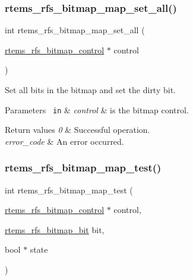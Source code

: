 \subsubsection{\texorpdfstring{rtems\_rfs\_bitmap\_map\_set\_all()}{rtems\_rfs\_bitmap\_map\_set\_all()}}
{\footnotesize\ttfamily int rtems\+\_\+rfs\+\_\+bitmap\+\_\+map\+\_\+set\+\_\+all (\begin{DoxyParamCaption}\item[{\mbox{\hyperlink{rtems-rfs-bitmaps_8h_aa1b1de5abc294444428eb1038d7f898b}{rtems\+\_\+rfs\+\_\+bitmap\+\_\+control}} $\ast$}]{control }\end{DoxyParamCaption})}

Set all bits in the bitmap and set the dirty bit.


\begin{DoxyParams}[1]{Parameters}
\mbox{\texttt{ in}}  & {\em control} & is the bitmap control.\\
\hline
\end{DoxyParams}

\begin{DoxyRetVals}{Return values}
{\em 0} & Successful operation. \\
\hline
{\em error\+\_\+code} & An error occurred. \\
\hline
\end{DoxyRetVals}
\mbox{\label{rtems-rfs-bitmaps_8c_abc6a4b7a3b0ef2602246517f9bb4e9a3}} 
\subsubsection{\texorpdfstring{rtems\_rfs\_bitmap\_map\_test()}{rtems\_rfs\_bitmap\_map\_test()}}
{\footnotesize\ttfamily int rtems\+\_\+rfs\+\_\+bitmap\+\_\+map\+\_\+test (\begin{DoxyParamCaption}\item[{\mbox{\hyperlink{rtems-rfs-bitmaps_8h_aa1b1de5abc294444428eb1038d7f898b}{rtems\+\_\+rfs\+\_\+bitmap\+\_\+control}} $\ast$}]{control,  }\item[{\mbox{\hyperlink{rtems-rfs-bitmaps_8h_acc1b0aefe1b090890ccbc1b05279a78e}{rtems\+\_\+rfs\+\_\+bitmap\+\_\+bit}}}]{bit,  }\item[{bool $\ast$}]{state }\end{DoxyParamCaption})}

